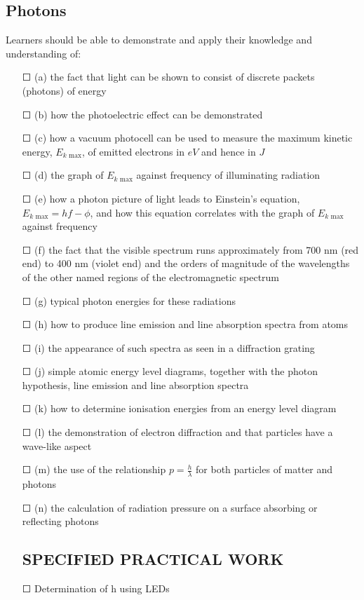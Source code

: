 \subsection{Photons}Learners should be able to demonstrate and apply their knowledge and
understanding of:
\begin{itemize}
	\item[\Large{$\Square$}] (a) the fact that light can be shown to consist of discrete packets (photons) of energy
	\item[\Large{$\Square$}]	(b) how the photoelectric effect can be demonstrated
	\item[\Large{$\Square$}]	(c) how a vacuum photocell can be used to measure the maximum kinetic
	energy, $E_{k\text{ max}}$, of emitted electrons in $eV$ and hence in \(J\)
	\item[\Large{$\Square$}]	(d) the graph of  $E_{k\text{ max}}$ against frequency of illuminating radiation
	\item[\Large{$\Square$}]	(e) how a photon picture of light leads to Einstein's equation,
	$E_{k\text{ max}}=hf-\phi$, and \sq how this equation correlates with the graph of  $E_{k\text{ max}}$ against frequency
	\item[\Large{$\Square$}]	(f) the fact that the visible spectrum runs approximately from 700 nm (red end) to 400 nm (violet end) and \sq the orders of magnitude of the wavelengths of the other named regions of the electromagnetic spectrum
	\item[\Large{$\Square$}]	(g) typical photon energies for these radiations
	\item[\Large{$\Square$}]	(h) how to produce line emission and line absorption spectra from atoms
	\item[\Large{$\Square$}]	(i) the appearance of such spectra as seen in a diffraction grating
	\item[\Large{$\Square$}]	(j) simple atomic energy level diagrams, together with the photon hypothesis, line emission and line absorption spectra
	\item[\Large{$\Square$}]	(k) how to determine ionisation energies from an energy level diagram
	\item[\Large{$\Square$}]	(l) the demonstration of electron diffraction and that particles have a wave-like	aspect
	\item[\Large{$\Square$}]	(m) the use of the relationship \( p=\frac{h}{\lambda} \) for both particles of matter and photons
	\item[\Large{$\Square$}]	(n) the calculation of radiation pressure on a surface absorbing or reflecting	photons
	\subsection*{SPECIFIED PRACTICAL WORK}
	\item[\Large{$\Square$}] Determination of h using LEDs
\end{itemize}

